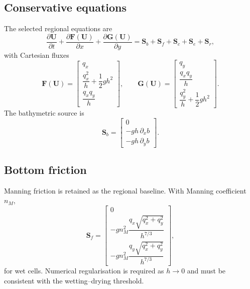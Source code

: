 \documentclass[11pt,a4paper]{article}
\newcommand{\vect}[1]{\bm{#1}}
\begin{document}
\subsection{Conservative equations}

The selected regional equations are
\begin{equation}
  \frac{\partial \vect U}{\partial t}
  +\frac{\partial \vect F(\vect U)}{\partial x}
  +\frac{\partial \vect G(\vect U)}{\partial y}
  =\vect S_b+\vect S_f+\vect S_c+\vect S_e+\vect S_r,
  \label{eq:nlswe}
\end{equation}
with Cartesian fluxes
\begin{equation}
\vect F(\vect U)=
\begin{bmatrix}
q_x\\[1mm]
\dfrac{q_x^2}{h}+\dfrac{1}{2}gh^2\\[1mm]
\dfrac{q_xq_y}{h}
\end{bmatrix},
\qquad
\vect G(\vect U)=
\begin{bmatrix}
q_y\\[1mm]
\dfrac{q_xq_y}{h}\\[1mm]
\dfrac{q_y^2}{h}+\dfrac{1}{2}gh^2
\end{bmatrix}.
\end{equation}
The bathymetric source is
\begin{equation}
  \vect S_b=
  \begin{bmatrix}
  0\\ -gh\,\partial_x b\\ -gh\,\partial_y b
  \end{bmatrix}.
\end{equation}

\subsection{Bottom friction}

Manning friction is retained as the regional baseline. With Manning coefficient $n_M$,
\begin{equation}
  \vect S_f=
  \begin{bmatrix}
  0\\[1mm]
  -g n_M^2\dfrac{q_x\sqrt{q_x^2+q_y^2}}{h^{7/3}}\\[3mm]
  -g n_M^2\dfrac{q_y\sqrt{q_x^2+q_y^2}}{h^{7/3}}
  \end{bmatrix},
  \label{eq:manning}
\end{equation}
for wet cells. Numerical regularisation is required as $h\rightarrow0$ and must be consistent with the wetting--drying threshold.
\end{document}
